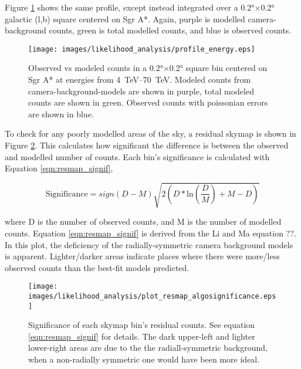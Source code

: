   Figure \ref{fig:gc_profile_energy} shows the same profile, except instead integrated over a \ang{0.2}$\times$\ang{0.2} galactic (l,b) square centered on Sgr A*.
  Again, purple is modelled camera-background counts, green is total modelled counts, and blue is observed counts.
  
  \begin{figure}[h]
    \centering
    \texttt{[image: images/likelihood\_analysis/profile\_energy.eps]}
    \caption[Galactic Center Profile vs Energy]{
      Observed vs modeled counts in a \ang{0.2}$\times$\ang{0.2} square bin centered on Sgr A* at energies from \SIrange{4}{70}{TeV}.
      Modeled counts from camera-background-models are shown in purple, total modeled counts are shown in green.
      Observed counts with poissonian errors are shown in blue.
    }
    \label{fig:gc_profile_energy}
  \end{figure}
  
  To check for any poorly modelled areas of the sky, a residual skymap is shown in Figure \ref{fig:gc_resmap}.
  This calculates how significant the difference is between the observed and modelled number of counts.
  Each bin's significance is calculated with Equation \ref{eqn:resmap_signif},
  
  \begin{equation}\label{eqn:resmap_signif}
    \text{Significance} = sign(D-M) \sqrt{ 2 \left ( D * \textrm{ln} \left ( \frac{D}{M} \right ) + M - D \right ) }
  \end{equation}
  
  where D is the number of observed counts, and M is the number of modelled counts.
  Equation \ref{eqn:resmap_signif} is derived from the Li and Ma {\color{red}equation ??}. 
  In this plot, the deficiency of the radially-symmetric camera background models is apparent.
  Lighter/darker areas indicate places where there were more/less observed counts than the best-fit models predicted.
  
  \begin{figure}[ht]
    \centering
    \texttt{[image: images/likelihood\_analysis/plot\_resmap\_algosignificance.eps]}
    \caption[Galactic Center Residual Map]
    {
      Significance of each skymap bin's residual counts.
      See equation \ref{eqn:resmap_signif} for details.
      The dark upper-left and lighter lower-right areas are due to the the radiall-symmetric background, when a non-radially symmetric one would have been more ideal.
    }
    \label{fig:gc_resmap}
  \end{figure}

